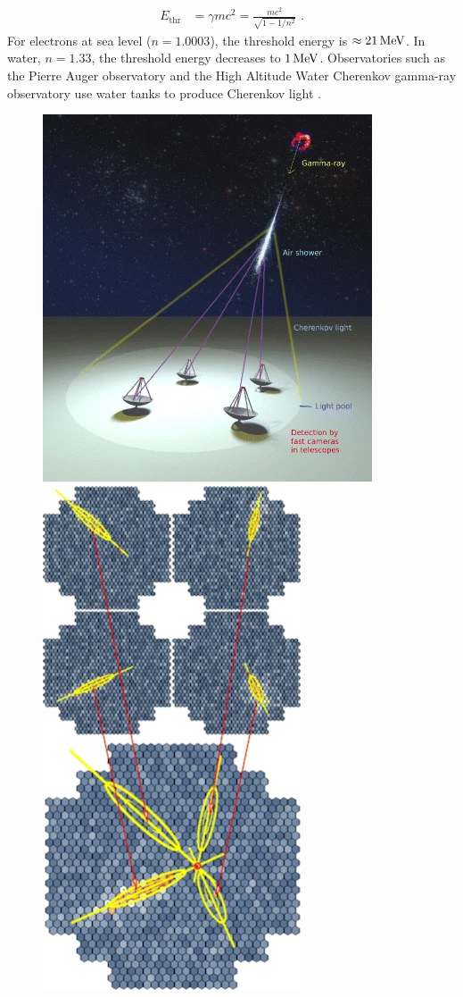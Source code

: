 \begin{equation}
    \begin{aligned}
    E_\text{thr}&=\gamma mc^2=\frac{mc^2}{\sqrt{1-{1}/{n^2}}}\text{ .}
    \end{aligned}
\end{equation}
\noindent For electrons at sea level ($n=1.0003$), the threshold energy is $\approx 21\,\si{\mega\electronvolt}$. In water, $n=1.33$, the threshold energy decreases to $1\,\si{\mega\electronvolt}$. Observatories such as the Pierre Auger observatory and the High Altitude Water Cherenkov gamma-ray observatory use water tanks to produce Cherenkov light \citep{alma9924446790001811}.

\begin{figure}[h]
    \centering
    \includegraphics[height=0.4\textheight]{05_Astronomy/Images/air_shower/chenkov_light_pool.png}
    \includegraphics[height=0.4\textheight]{05_Astronomy/Images/air_shower/cherenkov_telescope.png}

\end{figure}
